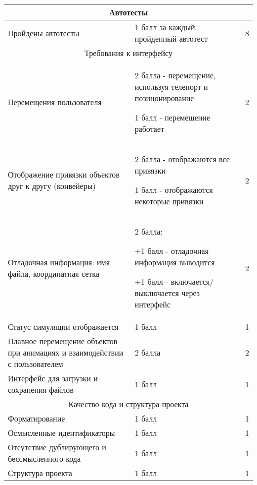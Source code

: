 \begin{tabular}{|p{4cm}|p{9cm}|p{1cm}|}
    \hline 
    \multicolumn{3}{|c|}{Автотесты} \\
    \hline

    Пройдены автотесты & 1 балл за каждый пройденный автотест & 8 \\
    \hline
    \hline

    \multicolumn{3}{|c|}{Требования к интерфейсу}	\\	
    \hline

    Перемещения пользователя & 2 балла - перемещение, используя телепорт и позицонирование

    1 балл - перемещение работает & 2 \\
    \hline


    Отображение привязки объектов друг к другу (конвейеры) & 2 балла - отображаются все привязки

    1 балл - отображаются некоторые привязки & 2 \\
    \hline


    Отладочная информация: имя файла, координатная сетка & 2 балла:

    +1 балл - отладочная информация выводится

    +1 балл - включается/выключается через интерфейс & 2 \\
    \hline


    Статус симуляции отображается & 1 балл & 1 \\
    \hline

    Плавное перемещение объектов при анимациях и взаимодействии с пользователем	& 2 балла &2 \\
    \hline

    Интерфейс для загрузки и сохранения файлов & 1 балл & 1 \\
    \hline
    \hline

    \multicolumn{3}{|c|}{Качество кода и структура проекта}\\
    \hline

    Форматирование & 1 балл & 1 \\
    \hline

    Осмысленные идентификаторы & 1 балл & 1 \\
    \hline

    Отсутствие дублирующего и бессмысленного кода & 1 балл & 1\\
    \hline

    Структура проекта & 1 балл & 1\\
    \hline


\end{tabular}
